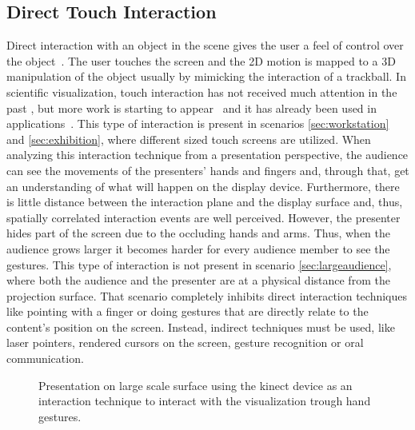 \documentclass[review,journal]{vgtc}         %
\begin{document}
\subsection{Direct Touch Interaction}
Direct interaction with an object in the scene gives the user a feel of control over the object~\cite{isenberg2009studying}. 
The user touches the screen and the 2D motion is mapped to a 3D manipulation of the object usually by mimicking the interaction of a trackball.
In scientific visualization, touch interaction has not received much attention in the past \cite{isenberg:hal-00781512}, but more work is starting to appear~\cite{Klein:2012:DSD:2322389.2322403} and it has already been used in applications~\cite{LRFPY11}.
This type of interaction is present in scenarios \ref{sec:workstation} and \ref{sec:exhibition}, where different sized touch screens are utilized. 
When analyzing this interaction technique from a presentation perspective, the audience can see the movements of the presenters' hands and fingers and, through that, get an understanding of what will happen on the display device.
Furthermore, there is little distance between the interaction plane and the display surface and, thus, spatially correlated interaction events are well perceived.
However, the presenter hides part of the screen due to the occluding hands and arms.
Thus, when the audience grows larger it becomes harder for every audience member to see the gestures.
This type of interaction is not present in scenario \ref{sec:largeaudience}, where both the audience and the presenter are at a physical distance from the projection surface.
That scenario completely inhibits direct interaction techniques like pointing with a finger or doing gestures that are directly relate to the content's position on the screen.
Instead, indirect techniques must be used, like laser pointers, rendered cursors on the screen, gesture recognition or oral communication.

\begin{figure}[htb]
	\centering
	\caption{Presentation on large scale surface using the kinect device as an interaction technique to interact with the visualization trough hand gestures.}
	\label{img:dome_clip}
\end{figure}
\end{document}
